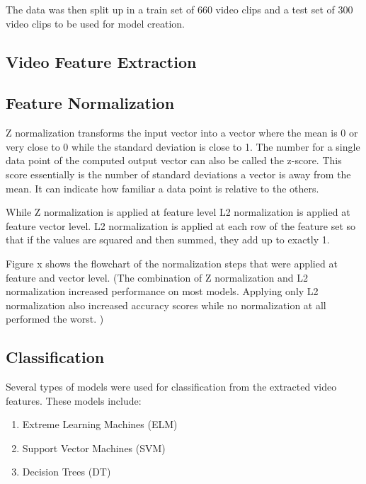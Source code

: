 The data was then split up in a train set of 660 video clips and a test set of 300 video clips to be used for model creation. 

\subsection{Video Feature Extraction}\label{subsection:featureextraction}



\subsection{Feature Normalization}
\label{subsection:normalization}
Z normalization transforms the input vector into a vector where the mean is 0 or very close to 0 while the standard deviation is close to 1. The number for a single data point of the computed output vector can also be called the z-score. This score essentially is the number of standard deviations a vector is away from the mean. It can indicate how familiar a data point is relative to the others. 

While Z normalization is applied at feature level L2 normalization is applied at feature vector level. L2 normalization is applied at each row of the feature set so that if the values are squared and then summed, they add up to exactly 1. 

Figure x shows the flowchart of the normalization steps that were applied at feature and vector level. (The combination of Z normalization and L2 normalization increased performance on most models. Applying only L2 normalization also increased accuracy scores while no normalization at all performed the worst. )

\subsection{Classification}
\label{subsection:classificaiton}
Several types of models were used for classification from the extracted video features. These models include:
\begin{enumerate}
\item Extreme Learning Machines (ELM)
\item Support Vector Machines (SVM)
\item Decision Trees (DT)
\end{enumerate}





